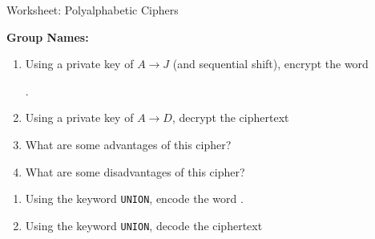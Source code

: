 \documentclass[12pt]{article}
\newcommand{\be}{\begin{enumerate}}
\newcommand{\ee}{\end{enumerate}}
\begin{document}
\begin{center}
{\Large  Worksheet:  Polyalphabetic Ciphers	}
\end{center}

\noindent \textbf{Group Names:} \hrulefill \\


\item {} 



\be
\item Using a private key of $A \to J$ (and sequential shift), encrypt the word 

.
\vfill

\item Using a private key of $A \to D$, decrypt the ciphertext 


\vfill

\item What are some advantages of this cipher?

\vfill

\item What are some disadvantages of this cipher?

\vfill
\ee
\newpage

\item {} 

\be
\item Using the keyword {\tt UNION}, encode the word .

\vfill

\item Using the keyword {\tt UNION}, decode the ciphertext   
\vfill




\end{enumerate}
\end{document}
